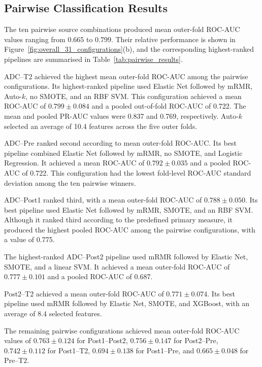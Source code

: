 \documentclass[12pt,twocolumn]{article}
\begin{document}
\subsection{Pairwise Classification Results}
\label{subsec:pairwise_results}

The ten pairwise source combinations produced mean outer-fold
ROC-AUC values ranging from 0.665 to 0.799. Their relative
performance is shown in
Figure~\ref{fig:overall_31_configurations}(b), and the corresponding
highest-ranked pipelines are summarised in
Table~\ref{tab:pairwise_results}.

ADC--T2 achieved the highest mean outer-fold ROC-AUC among the
pairwise configurations. Its highest-ranked pipeline used Elastic Net
followed by mRMR, Auto-\(k\), no SMOTE, and an RBF SVM. This
configuration achieved a mean ROC-AUC of
\(0.799 \pm 0.084\) and a pooled out-of-fold ROC-AUC of 0.722.
The mean and pooled PR-AUC values were 0.837 and 0.769,
respectively. Auto-\(k\) selected an average of 10.4 features across
the five outer folds.

ADC--Pre ranked second according to mean outer-fold ROC-AUC. Its
best pipeline combined Elastic Net followed by mRMR, no SMOTE, and
Logistic Regression. It achieved a mean ROC-AUC of
\(0.792 \pm 0.035\) and a pooled ROC-AUC of 0.722. This
configuration had the lowest fold-level ROC-AUC standard deviation
among the ten pairwise winners.

ADC--Post1 ranked third, with a mean outer-fold ROC-AUC of
\(0.788 \pm 0.050\). Its best pipeline used Elastic Net followed by
mRMR, SMOTE, and an RBF SVM. Although it ranked third according to
the predefined primary measure, it produced the highest pooled
ROC-AUC among the pairwise configurations, with a value of 0.775.

The highest-ranked ADC--Post2 pipeline used mRMR followed by Elastic
Net, SMOTE, and a linear SVM. It achieved a mean outer-fold ROC-AUC
of \(0.777 \pm 0.101\) and a pooled ROC-AUC of 0.687.

Post2--T2 achieved a mean outer-fold ROC-AUC of
\(0.771 \pm 0.074\). Its best pipeline used mRMR followed by Elastic
Net, SMOTE, and XGBoost, with an average of 8.4 selected features.

The remaining pairwise configurations achieved mean outer-fold
ROC-AUC values of \(0.763 \pm 0.124\) for Post1--Post2,
\(0.756 \pm 0.147\) for Post2--Pre,
\(0.742 \pm 0.112\) for Post1--T2,
\(0.694 \pm 0.138\) for Post1--Pre, and
\(0.665 \pm 0.048\) for Pre--T2.
\end{document}
